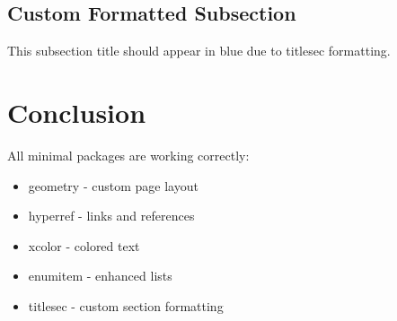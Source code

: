 \documentclass{article}
\begin{document}
\subsection{Custom Formatted Subsection}
This subsection title should appear in blue due to titlesec formatting.

\section{Conclusion}
All minimal packages are working correctly:
\begin{itemize}
    \item \textcolor{green}{\checkmark} geometry - custom page layout
    \item \textcolor{green}{\checkmark} hyperref - links and references
    \item \textcolor{green}{\checkmark} xcolor - colored text
    \item \textcolor{green}{\checkmark} enumitem - enhanced lists
    \item \textcolor{green}{\checkmark} titlesec - custom section formatting
\end{itemize}
\end{document}

